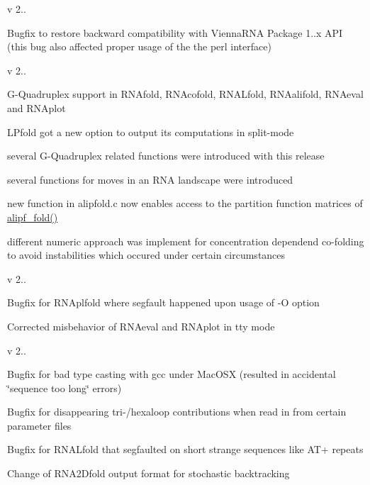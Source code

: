 v 2..
\begin{DoxyItemize}
\item Bugfix to restore backward compatibility with Vienna\+R\+NA Package 1..\+x A\+PI (this bug also affected proper usage of the the perl interface)
\end{DoxyItemize}

v 2..
\begin{DoxyItemize}
\item G-\/\+Quadruplex support in R\+N\+Afold, R\+N\+Acofold, R\+N\+A\+Lfold, R\+N\+Aalifold, R\+N\+Aeval and R\+N\+Aplot
\item L\+Pfold got a new option to output its computations in split-\/mode
\item several G-\/\+Quadruplex related functions were introduced with this release
\item several functions for moves in an R\+NA landscape were introduced
\item new function in alipfold.\+c now enables access to the partition function matrices of \mbox{\hyperlink{group__consensus__pf__fold_ga1a5f6cfb9d761fa862ce4edc7c369cd2}{alipf\+\_\+fold()}}
\item different numeric approach was implement for concentration dependend co-\/folding to avoid instabilities which occured under certain circumstances
\end{DoxyItemize}

v 2..
\begin{DoxyItemize}
\item Bugfix for R\+N\+Aplfold where segfault happened upon usage of -\/O option
\item Corrected misbehavior of R\+N\+Aeval and R\+N\+Aplot in tty mode
\end{DoxyItemize}

v 2..
\begin{DoxyItemize}
\item Bugfix for bad type casting with gcc under Mac\+O\+SX (resulted in accidental \char`\"{}sequence too long\char`\"{} errors)
\item Bugfix for disappearing tri-\//hexaloop contributions when read in from certain parameter files
\item Bugfix for R\+N\+A\+Lfold that segfaulted on short strange sequences like A\+T+ repeats
\item Change of R\+N\+A2\+Dfold output format for stochastic backtracking
\end{DoxyItemize}

